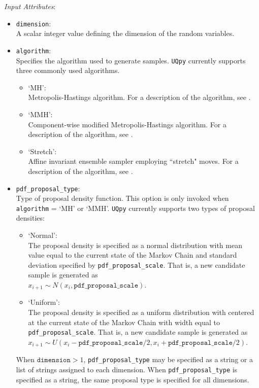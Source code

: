 \noindent\textit{Input Attributes}:
\begin{itemize}
\item \texttt{dimension}:\\ 
	A scalar integer value defining the dimension of the random variables. 
\item \texttt{algorithm}: \\ 
	Specifies the algorithm used to generate samples. \texttt{UQpy} currently supports three commonly used algorithms.
	\begin{itemize}
		\item `MH': \\ 
			Metropolis-Hastings algorithm. For a description of the algorithm, see \cite{Metropolis1953,Hastings1970,Au2001}. 
		\item `MMH': \\ 
			Component-wise modified Metropolis-Hastings algorithm. For a description of the algorithm, see \cite{Au2001}. 
		\item `Stretch': \\ 
			Affine invariant ensemble sampler employing ``stretch" moves. For a description of the algorithm, see \cite{Goodman2010}.
	\end{itemize} 
\item \texttt{pdf\_proposal\_type}:\\ 
	Type of proposal density function. This option is only invoked when \texttt{algorithm} = `MH' or `MMH'. \texttt{UQpy} currently supports two types of proposal densities:
	\begin{itemize}
		\item `Normal': \\
			The proposal density is specified as a normal distribution with mean value equal to the current state of the Markov Chain and standard deviation specified by 						\texttt{pdf\_proposal\_scale}. That is, a new candidate sample is generated as\\ $x_{i+1}\sim N(x_i,\texttt{pdf\_proposal\_scale})$.
		\item `Uniform': \\
			The proposal density is specified as a uniform distribution with centered at the current state of the Markov Chain with width equal to \texttt{pdf\_proposal\_scale}. That is, a 			new candidate sample is generated as\\ $x_{i+1}\sim U(x_i-\texttt{pdf\_proposal\_scale}/2,x_i+\texttt{pdf\_proposal\_scale}/2)$.
		\end{itemize}
		When $\texttt{dimension}>1$, \texttt{pdf\_proposal\_type} may be specified as a string or a list of strings assigned to each dimension. When \texttt{pdf\_proposal\_type} is 			specified as a string, the same proposal type is specified for all dimensions.

\end{itemize}
